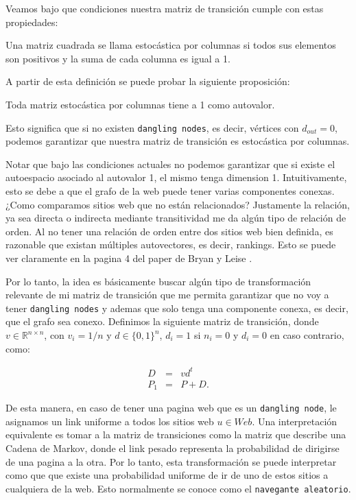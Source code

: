 Veamos bajo que condiciones nuestra matriz de transición cumple con estas propiedades:

\begin{definition}
Una matriz cuadrada se llama estocástica por columnas si todos sus elementos son positivos y la suma de cada columna es igual a 1.
\end{definition}

A partir de esta definición se puede probar la siguiente proposición:
\begin{proposition}
Toda matriz estocástica por columnas tiene a 1 como autovalor.
\end{proposition}

Esto significa que si no existen \texttt{dangling nodes}, es decir, vértices con $d_{out} = 0$, podemos garantizar que nuestra matriz de transición es estocástica por columnas.

Notar que bajo las condiciones actuales no podemos garantizar que si existe el autoespacio asociado al autovalor 1, el mismo tenga dimension 1. Intuitivamente, esto se debe a que el grafo de la web puede tener varias componentes conexas.¿Como comparamos sitios web que no están relacionados? Justamente la relación, ya sea directa o indirecta mediante transitividad me da algún tipo de relación de orden. Al no tener una relación de orden entre dos sitios web bien definida, es razonable que existan múltiples autovectores, es decir, rankings. Esto se puede ver claramente en la pagina 4 del paper de Bryan y Leise \cite{Bryan2006}.

Por lo tanto, la idea es básicamente buscar algún tipo de transformación relevante de mi matriz de transición que me permita garantizar que no voy a tener \texttt{dangling nodes} y ademas que solo tenga una componente conexa, es decir, que el grafo sea conexo. Definimos la siguiente matriz de transición, donde $v \in \mathbb{R}^{n \times n}$, con $v_i = 1 / n$ y $d \in \{0,1\}^n$,  $d_i = 1$ si $n_i = 0$ y $d_i = 0$ en caso contrario, como:

\begin{eqnarray*}
D & = & v d^t \\
P_1 & = & P + D.
\end{eqnarray*}

De esta manera, en caso de tener una pagina web que es un \texttt{dangling node}, le asignamos un link uniforme a todos los sitios web $u \in Web$. Una interpretación equivalente es tomar a la matriz de transiciones como la matriz que describe una Cadena de Markov, donde el link pesado representa la probabilidad de dirigirse de una pagina a la otra. Por lo tanto, esta transformación se puede interpretar como que que existe una probabilidad uniforme de ir de uno de estos sitios a cualquiera de la web. Esto normalmente se conoce como el \texttt{navegante aleatorio}.

